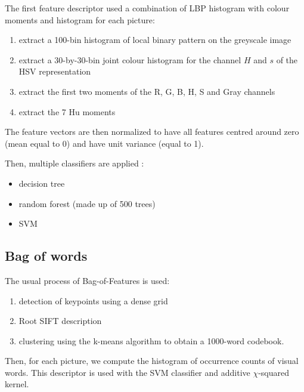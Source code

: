 The first feature descriptor used a combination of LBP histogram with colour moments and histogram for each picture:
\begin{enumerate}
    \item extract a 100-bin histogram of local binary pattern on the greyscale image
    \item extract a 30-by-30-bin joint colour histogram for the channel $H$ and $s$ of the HSV  representation
    \item extract the first two moments of the R, G, B, H, S and Gray channels
    \item extract the 7 Hu moments
\end{enumerate}

The feature vectors are then normalized to have all features centred around zero (mean equal to 0) and have unit variance (equal to 1).

Then, multiple classifiers are applied :
\begin{itemize}
    \item decision tree
    \item random forest (made up of 500 trees)
    \item SVM
\end{itemize}


\subsection{Bag of words}

The usual process of Bag-of-Features is used:
\begin{enumerate}
    \item detection of keypoints using a dense grid
    \item Root SIFT description
    \item clustering using the k-means algorithm to obtain a 1000-word codebook.
\end{enumerate}

Then, for each picture, we compute the histogram of occurrence counts of visual words. This descriptor is used with the SVM classifier and additive $\chi$-squared kernel.

